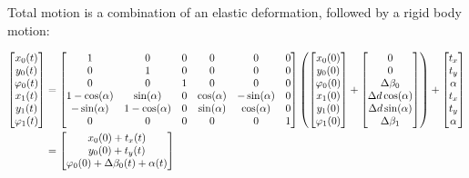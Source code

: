 Total motion is a combination of an elastic deformation, followed by a rigid body motion:

\begin{align}
\begin{bmatrix}
x_0(t) \\
y_0(t) \\
\varphi_0(t) \\
x_1(t) \\
y_1(t) \\
\varphi_1(t)
\end{bmatrix}
&= \begin{bmatrix}
1 & 0 & 0 & 0 & 0 & 0 \\
0 & 1 & 0 & 0 & 0 & 0 \\
0 & 0 & 1 & 0 & 0 & 0 \\
1-\cos(\alpha) & \sin(\alpha) & 0 & \cos(\alpha) & -\sin(\alpha) & 0 \\
-\sin(\alpha) & 1-\cos(\alpha) & 0 & \sin(\alpha) & \cos(\alpha) & 0 \\
0 & 0 & 0 & 0 & 0 & 1
\end{bmatrix}
\left(
\begin{bmatrix}
x_0(0) \\
y_0(0) \\
\varphi_0(0) \\
x_1(0) \\
y_1(0) \\
\varphi_1(0)
\end{bmatrix}
+
\begin{bmatrix}
0 \\
0 \\
\Delta\beta_0 \\
\Delta d \cos(\alpha) \\
\Delta d \sin(\alpha) \\
\Delta \beta_1
\end{bmatrix}
\right)
+
\begin{bmatrix}
t_x \\
t_y \\
\alpha \\
t_x \\
t_y \\
\alpha
\end{bmatrix} \notag \\
&= \begin{bmatrix}
x_0(0) + t_x(t) \\
y_0(0) + t_y(t) \\
\varphi_0(0) + \Delta\beta_0(t) + \alpha(t)
\end{bmatrix}
\end{align}

